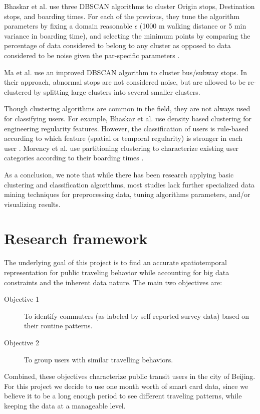 \documentclass{article}
\begin{document}
Bhaskar et al. use three DBSCAN algorithms to cluster Origin stops, Destination stops, and boarding times. For each of the previous, they tune the algorithm parameters by fixing a domain reasonable $\epsilon$ (1000 m walking distance or 5 min variance in boarding time), and selecting the minimum points by comparing the percentage of data considered to belong to any cluster as opposed to data considered to be noise given the par-specific parameters \cite{bhaskar2015passenger}. 

Ma et al. use an improved DBSCAN algorithm to cluster bus/subway stops. In their approach, abnormal stops are not considered noise, but are allowed to be re-clustered by splitting large clusters into several smaller clusters. 

Though clustering algorithms are common in the field, they are not always used for classifying users. For example, Bhaskar et al. use density based clustering for engineering regularity features. However, the classification of users is rule-based according to which feature (spatial or temporal regularity) is stronger in each user \cite{bhaskar2015passenger}. Morency et al. use partitioning clustering to characterize existing user categories according to their boarding times \cite{morency2007measuring}. 

As a conclusion, we note that while there has been research applying basic clustering and classification algorithms, most studies lack further specialized data mining techniques for preprocessing data, tuning algorithms parameters, and/or visualizing results. 


\newpage
\section{Research framework}
The underlying goal of this project is to find an accurate spatiotemporal representation for public traveling behavior while accounting for big data constraints and the inherent data nature. The main two objectives are:

\begin{description}
\item[Objective 1] To identify commuters (as labeled by self reported survey data) based on their routine patterns. \label{eqn:obj1}
\item[Objective 2] To group users with similar travelling behaviors. \label{eqn:obj2}
\end{description}

Combined, these objectives characterize public transit users in the city of Beijing. For this project we decide to use one month worth of smart card data, since we believe it to be a long enough period to see different traveling patterns, while keeping the data at a manageable level. 
\end{document}
